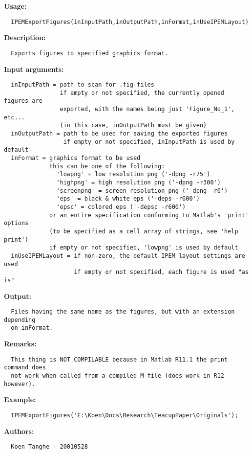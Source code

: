 \textbf{Usage:}
\begin{verbatim}  IPEMExportFigures(inInputPath,inOutputPath,inFormat,inUseIPEMLayout)

\end{verbatim}
\textbf{Description:}
\begin{verbatim}  Exports figures to specified graphics format.

\end{verbatim}
\textbf{Input arguments:}
\begin{verbatim}  inInputPath = path to scan for .fig files
                if empty or not specified, the currently opened figures are
                exported, with the names being just 'Figure_No_1', etc...
                (in this case, inOutputPath must be given)
  inOutputPath = path to be used for saving the exported figures
                 if empty or not specified, inInputPath is used by default
  inFormat = graphics format to be used
             this can be one of the following:
               'lowpng' = low resolution png ('-dpng -r75')
               'highpng' = high resolution png ('-dpng -r300')
               'screenpng' = screen resolution png ('-dpng -r0')
               'eps' = black & white eps ('-deps -r600')
               'epsc' = colored eps ('-depsc -r600')
             or an entire specification conforming to Matlab's 'print' options
             (to be specified as a cell array of strings, see 'help print')
             if empty or not specified, 'lowpng' is used by default
  inUseIPEMLayout = if non-zero, the default IPEM layout settings are used
                    if empty or not specified, each figure is used "as is"

\end{verbatim}
\textbf{Output:}
\begin{verbatim}  Files having the same name as the figures, but with an extension depending
  on inFormat.

\end{verbatim}
\textbf{Remarks:}
\begin{verbatim}  This thing is NOT COMPILABLE because in Matlab R11.1 the print command does
  not work when called from a compiled M-file (does work in R12 however).

\end{verbatim}
\textbf{Example:}
\begin{verbatim}  IPEMExportFigures('E:\Koen\Docs\Research\TeacupPaper\Originals');

\end{verbatim}
\textbf{Authors:}
\begin{verbatim}  Koen Tanghe - 20010528
\end{verbatim}


